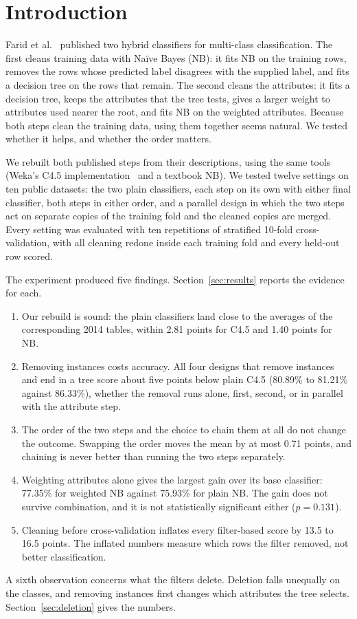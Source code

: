 \documentclass[conference]{IEEEtran}
\begin{document}
\section{Introduction}
Farid et al.~\cite{farid2014hybrid} published two hybrid classifiers for
multi-class classification. The first cleans training data with Na\"ive Bayes
(NB): it fits NB on the training rows, removes the rows whose predicted label
disagrees with the supplied label, and fits a decision tree on the rows that
remain. The second cleans the attributes: it fits a decision tree, keeps the
attributes that the tree tests, gives a larger weight to attributes used nearer
the root, and fits NB on the weighted attributes. Because both steps clean the
training data, using them together seems natural. We tested whether it helps,
and whether the order matters.

We rebuilt both published steps from their descriptions, using the same tools
(Weka's C4.5 implementation~\cite{witten2016weka} and a textbook NB). We tested
twelve settings on ten public datasets: the two plain classifiers, each step on
its own with either final classifier, both steps in either order, and a
parallel design in which the two steps act on separate copies of the training
fold and the cleaned copies are merged. Every setting was evaluated with ten
repetitions of stratified 10-fold cross-validation, with all cleaning redone
inside each training fold and every held-out row scored.

The experiment produced five findings. Section~\ref{sec:results} reports the
evidence for each.
\begin{enumerate}
\item Our rebuild is sound: the plain classifiers land close to the averages of
the corresponding 2014 tables, within 2.81 points for C4.5 and 1.40 points for
NB.
\item Removing instances costs accuracy. All four designs that remove
instances and end in a tree score about five points below plain C4.5 (80.89\%
to 81.21\% against 86.33\%), whether the removal runs alone, first, second, or
in parallel with the attribute step.
\item The order of the two steps and the choice to chain them at all do not
change the outcome. Swapping the order moves the mean by at most 0.71 points,
and chaining is never better than running the two steps separately.
\item Weighting attributes alone gives the largest gain over its base
classifier: 77.35\% for weighted NB against 75.93\% for plain NB. The gain does
not survive combination, and it is not statistically significant either
($p=0.131$).
\item Cleaning before cross-validation inflates every filter-based score by
13.5 to 16.5 points. The inflated numbers measure which rows the filter
removed, not better classification.
\end{enumerate}
A sixth observation concerns what the filters delete. Deletion falls unequally
on the classes, and removing instances first changes which attributes the tree
selects. Section~\ref{sec:deletion} gives the numbers.
\end{document}
